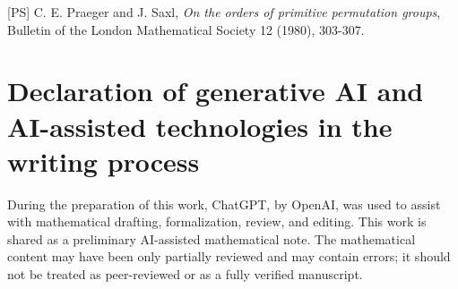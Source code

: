 \documentclass[11pt]{article}
\begin{document}
[PS] C. E. Praeger and J. Saxl, \emph{On the orders of primitive permutation groups}, Bulletin of the London Mathematical Society 12 (1980), 303-307.

\section*{Declaration of generative AI and AI-assisted technologies in the writing process}
During the preparation of this work, ChatGPT, by OpenAI, was used to assist with mathematical drafting, formalization, review, and editing. This work is shared as a preliminary AI-assisted mathematical note. The mathematical content may have been only partially reviewed and may contain errors; it should not be treated as peer-reviewed or as a fully verified manuscript.
\end{document}
